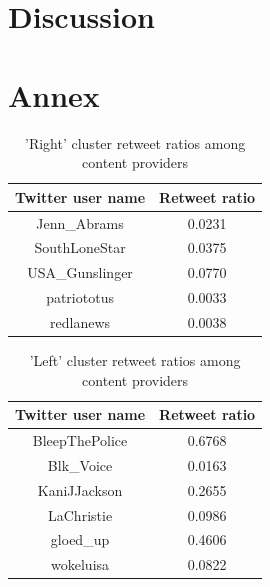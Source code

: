 \documentclass[12pt, authoryear]{elsarticle}
\begin{document}
\section{Discussion}
 
\pagebreak



\clearpage

\section{Annex}

\begin{center}
\begin{table}[H]
\begin{tabular}{ c c }
Twitter user name & Retweet ratio \\
 \hline
Jenn\_Abrams	&	0.0231\\
SouthLoneStar	&	0.0375\\
USA\_Gunslinger&	0.0770\\
patriototus		&	0.0033\\
redlanews		&	0.0038\\
 \hline
\end{tabular}
\caption{'Right' cluster retweet ratios among content providers}
\label{table:1}
\end{table}
\end{center}

\begin{center}
\begin{table}[H]
\begin{tabular}{ c c }
Twitter user name & Retweet ratio \\
 \hline
BleepThePolice &   0.6768 \\
Blk\_Voice       &  0.0163 \\
KaniJJackson   &   0.2655 \\
LaChristie  &      0.0986 \\
gloed\_up       &   0.4606 \\
wokeluisa     &    0.0822 \\
 \hline
\end{tabular}
\caption{'Left' cluster retweet ratios among content providers}
\label{table:2}
\end{table}
\end{center}
\end{document}
